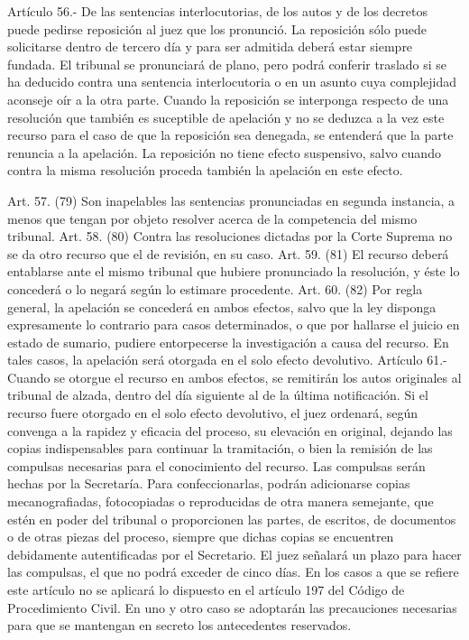     Artículo 56.- De las sentencias interlocutorias, de los autos y de los decretos puede pedirse reposición al juez que los pronunció.
      La reposición sólo puede solicitarse dentro de tercero día y para ser admitida  deberá estar siempre fundada.
    El tribunal se pronunciará de plano, pero podrá conferir traslado si se ha deducido contra una sentencia interlocutoria o en un asunto cuya complejidad aconseje oír a la otra parte.
    Cuando la reposición se interponga respecto de una resolución que también es suceptible de apelación y no se deduzca a la vez este recurso para el caso de que la reposición sea denegada, se entenderá que la parte renuncia a la apelación.
    La reposición no tiene efecto suspensivo, salvo cuando contra la misma resolución proceda también la apelación en este efecto.

    Art. 57. (79) Son inapelables las sentencias pronunciadas en segunda instancia, a menos que tengan por objeto resolver acerca de la competencia del mismo tribunal.
    Art. 58. (80) Contra las resoluciones dictadas por la Corte Suprema no se da otro recurso que el de revisión, en su caso.
    Art. 59. (81) El recurso deberá entablarse ante el mismo tribunal que hubiere pronunciado la resolución, y éste lo concederá o lo negará según lo estimare procedente.
    Art. 60. (82) Por regla general, la apelación se concederá en ambos efectos, salvo que la ley disponga expresamente lo contrario para casos determinados, o que por hallarse el juicio en estado de sumario, pudiere entorpecerse la investigación a causa del recurso. En tales casos, la apelación será otorgada en el solo efecto devolutivo.
    Artículo 61.- Cuando se otorgue el recurso en ambos efectos, se remitirán los autos originales al tribunal de alzada, dentro del día siguiente al de la última notificación.
    Si el recurso fuere otorgado en el solo efecto devolutivo, el juez ordenará, según convenga a la rapidez y eficacia del proceso, su elevación en original, dejando las copias indispensables para continuar la tramitación, o bien la remisión de las compulsas necesarias para el conocimiento del recurso.
    Las compulsas serán hechas por la Secretaría. Para confeccionarlas, podrán adicionarse copias mecanografiadas, fotocopiadas o reproducidas de otra manera semejante, que estén en poder del tribunal o proporcionen las partes, de escritos, de documentos o de otras piezas del proceso, siempre que dichas copias se encuentren debidamente autentificadas por el Secretario. El juez señalará un plazo para hacer las compulsas, el que no podrá exceder de cinco días.
    En los casos a que se refiere este artículo no se aplicará lo dispuesto en el artículo 197 del Código de Procedimiento Civil.
    En uno y otro caso se adoptarán las precauciones necesarias para que se mantengan en secreto los antecedentes reservados.

